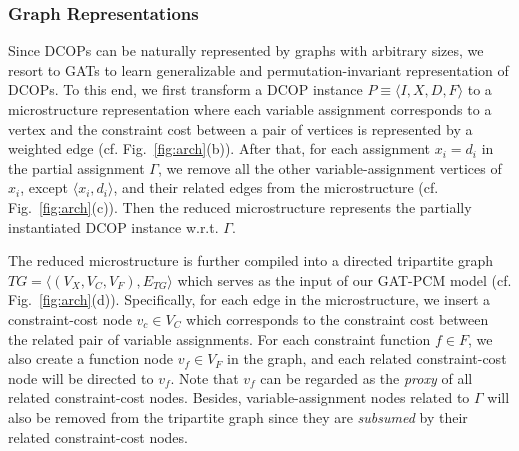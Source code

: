 \documentclass[letterpaper]{article} %
\begin{document}
\subsubsection{Graph Representations}
Since DCOPs can be naturally represented by graphs with arbitrary sizes, we resort to GATs to learn generalizable and permutation-invariant representation of DCOPs. 
To this end, we first transform a DCOP instance $P\equiv\langle I,X,D,F\rangle$ to a microstructure representation \cite{jegou1993decomposition} where each variable assignment corresponds to a vertex and 
the constraint cost between a pair of vertices is represented by a weighted edge (cf. Fig.~\ref{fig:arch}(b)). After that, for each assignment $x_i= d_i$ in the partial assignment $\Gamma$, we remove all the other variable-assignment vertices of $x_i$, except $\langle x_i, d_i\rangle$, and their related edges from the microstructure (cf. Fig.~\ref{fig:arch}(c)). Then the reduced microstructure represents the partially instantiated DCOP instance w.r.t. $\Gamma$.

The reduced microstructure is further compiled into a directed tripartite graph $TG=\langle (V_X, V_C,V_F),E_{TG}\rangle$ which serves as the input of our GAT-PCM model (cf. Fig.~\ref{fig:arch}(d)). Specifically, for each edge in the microstructure, we insert a constraint-cost node $v_c\in V_C$ which corresponds to the constraint cost between the related pair of variable assignments. For each constraint function $f\in F$, we also create a function node $v_f \in V_F$ in the graph, and each related constraint-cost node will be directed to $v_f$. Note that $v_f$ can be regarded as the \emph{proxy} of all related constraint-cost nodes.
Besides, variable-assignment nodes related to $\Gamma$ will also be removed from the tripartite graph since they are \emph{subsumed} by their related constraint-cost nodes.
\end{document}
